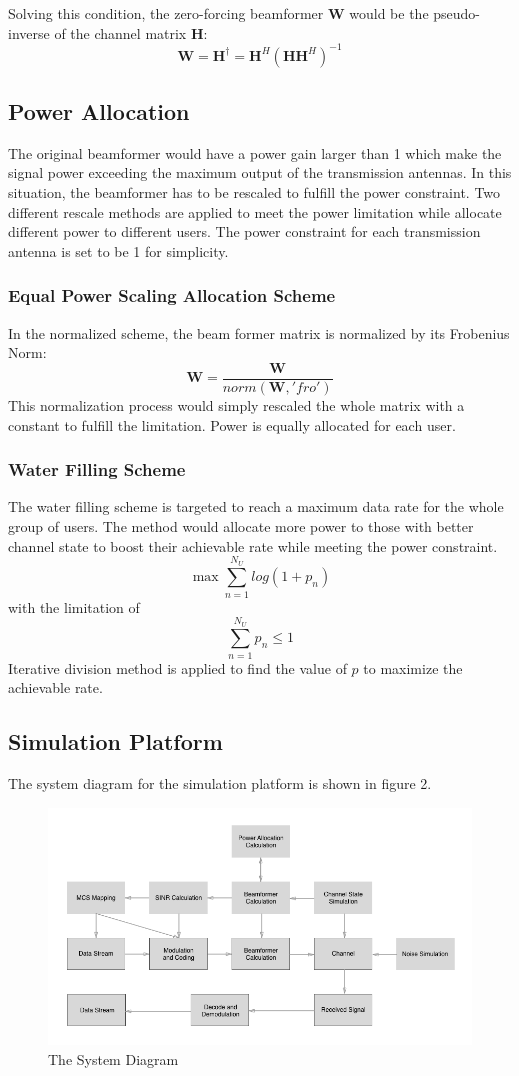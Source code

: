 \documentclass{article}
\begin{document}
\noindent
Solving this condition, the zero-forcing beamformer \textbf{W} would be the pseudo-inverse of the channel matrix \textbf{H}:
\[
\textbf{W} = \textbf{H}^{\dagger} = \textbf{H}^H(\textbf{H}\textbf{H}^H)^{-1}
\]
\subsection{Power Allocation}
The original beamformer would have a power gain larger than 1 which make the signal power exceeding the maximum output of the transmission antennas.
In this situation, the beamformer has to be rescaled to fulfill the power constraint.
Two different rescale methods are applied to meet the power limitation while allocate different power to different users.
The power constraint for each transmission antenna is set to be 1 for simplicity.

\subsubsection{Equal Power Scaling Allocation Scheme}
In the normalized scheme, the beam former matrix is normalized by its Frobenius Norm:
$$
\textbf{W} = \frac{\textbf{W}}{norm(\textbf{W}, 'fro')}
$$
This normalization process would simply rescaled the whole matrix with a constant to fulfill the limitation.
Power is equally allocated for each user.
\subsubsection{Water Filling Scheme}
The water filling scheme is targeted to reach a maximum data rate for the whole group of users.
The method would allocate more power to those with better channel state to boost their achievable rate while meeting the power constraint.
$$
\max \sum_{n=1}^{N_U} log(1+p_n)
$$
with the limitation of
$$\sum_{n=1}^{N_U} p_n \leq 1$$
Iterative division method is applied to find the value of $p$ to maximize the achievable rate.

\subsection{Simulation Platform}
The system diagram for the simulation platform is shown in figure 2.
\begin{figure}[ht]
\centering
\includegraphics[scale=0.5]{SystemDia.png}
\caption{The System Diagram}
\label{fig:SystemDia}
\end{figure}
\end{document}
